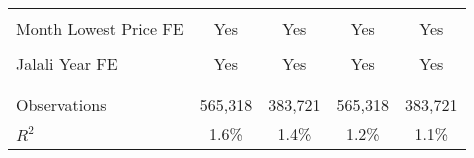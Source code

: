 \documentclass[border=0.2cm]{standalone}
\begin{document}
\begin{tabular}{lcccc}
    \vspace{4pt}           &                                                &                                                &                                                 &                                                \\
    Month Lowest Price FE  & Yes                                            & Yes                                            & Yes                                             & Yes                                            \\
    \vspace{4pt}           &                                                &                                                &                                                 &                                                \\
    Jalali Year FE         & Yes                                            & Yes                                            & Yes                                             & Yes                                            \\
    \vspace{4pt}           &                                                &                                                &                                                 &                                                \\
    \vspace{4pt}           & \begin{footnotesize}\end{footnotesize}         & \begin{footnotesize}\end{footnotesize}         & \begin{footnotesize}\end{footnotesize}          & \begin{footnotesize}\end{footnotesize}         \\
    Observations           & 565,318                                        & 383,721                                        & 565,318                                         & 383,721                                        \\
    $R^2$                  & 1.6\%                                          & 1.4\%                                          & 1.2\%                                           & 1.1\%                                          \\

\end{tabular}
\end{document}
